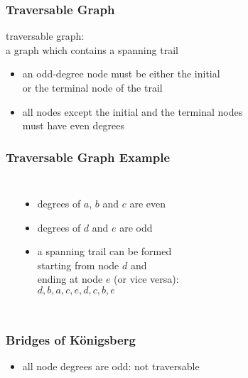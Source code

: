 \documentclass[dvipsnames]{beamer}
\begin{document}
\begin{frame}
  \frametitle{Traversable Graph}

  \begin{definition}
    \alert{traversable graph}:\\
    a graph which contains a spanning trail
  \end{definition}

  \begin{itemize}
    \pause
    \item an odd-degree node must be either the initial\\
      or the terminal node of the trail

    \pause
    \item all nodes except the initial and the terminal nodes\\
      must have even degrees
  \end{itemize}
\end{frame}

\begin{frame}
  \frametitle{Traversable Graph Example}

  \begin{example}
    \begin{columns}
      \begin{center}
      \end{center}

      \pause
      \begin{itemize}
        \item degrees of $a$, $b$ and $c$ are even
        \item degrees of $d$ and $e$ are odd
        \pause
        \item a spanning trail can be formed\\
          starting from node $d$ and\\
          ending at node $e$ (or vice versa):\\
          $d,b,a,c,e,d,c,b,e$
      \end{itemize}
    \end{columns}
  \end{example}
\end{frame}

\begin{frame}
  \frametitle{Bridges of Königsberg}

  \begin{center}
  \end{center}

  \pause
  \begin{itemize}
    \item all node degrees are odd: not traversable
  \end{itemize}
\end{frame}
\end{document}
